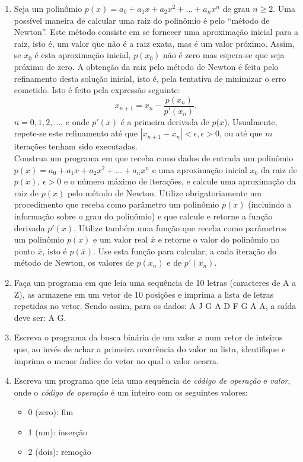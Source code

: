 \begin{enumerate}
\item Seja um polinômio $p(x)= a_0 + a_1 x + a_2 x^2 + \ldots + a_n x^n$ de
  grau $n \ge 2$. Uma possível maneira de calcular uma raiz do polinômio
  é pelo ``método de Newton''. Este método consiste em se fornecer uma
  aproximação inicial para a raiz, isto é, um valor que não é a raiz
  exata, mas é um valor próximo.  Assim, se $x_0$ é esta
  aproximação inicial, $p(x_0)$ não é zero mas espera-se que
  seja próximo de zero.  A obtenção da raiz pelo método de Newton é
  feita pelo refinamento desta solução inicial, isto é, pela tentativa
  de minimizar o erro cometido. Isto é feito pela expressão seguinte:
\[x_{n+1}=x_{n}-\frac{p(x_{n})}{p\prime(x_{n})},\]  $n=0,1,2,\ldots$,  e
  onde $p\prime(x)$ é a primeira derivada de $p(x$). Usualmente, repete-se
  este refinamento até que $|x_{n+1}-x_{n}| < \epsilon, \epsilon>0$, ou
  até que $m$ iterações tenham sido executadas. \\
  Construa um programa em  que receba como dados de entrada 
  um polinômio $p(x)= a_0 + a_1 x + a_2 x^2 + \ldots + a_n x^n$ e
  uma  aproximação inicial  $x_0$ da  raiz de  $p(x)$, $\epsilon>0$  e o
  número  máximo de  iterações, e  calcule  uma aproximação  da raiz  de
  $p(x)$ pelo método de Newton. Utilize obrigatoriamente um procedimento
  que receba como parâmetro  um polinômio $p(x)$ (incluindo a informação
  sobre o grau do polinômio) e que calcule e retorne a função
  derivada  $p\prime(x)$.  Utilize também  uma  função  que receba  como
  parâmetros um polinômio $p(x)$ e um valor real $\overline{x}$ e retorne
  o   valor    do   polinômio    no   ponto   $\overline{x}$,    isto   é
  $p(\overline{x})$. Use  esta função para  calcular, a cada  iteração do
  método    de    Newton,    os    valores   de    $p(x_{n})$    e    de
  $p\prime(x_{n})$.  

\item Faça um programa em  que leia uma sequência de 10 
     letras (caracteres de A a Z), as armazene em um vetor de 10 posições 
     e imprima a lista de letras repetidas no vetor. Sendo assim, para os 
     dados: A J G A D F G A A, a saída deve ser: A G.

\item Escreva o programa da busca binária de um valor $x$ num 
     vetor de inteiros que, ao invés de achar a primeira ocorrência do valor 
     na lista, identifique e imprima o menor índice do vetor no qual o valor 
     ocorra.

\item Escreva um programa que leia uma sequência de {\em código de
operação} e {\em valor}, onde o {\em código de operação} é um inteiro com
os seguintes valores:
\begin{itemize}
\item 0 (zero): fim
\item 1 (um): inserção
\item 2 (dois): remoção
\end{itemize} 


\end{enumerate}
